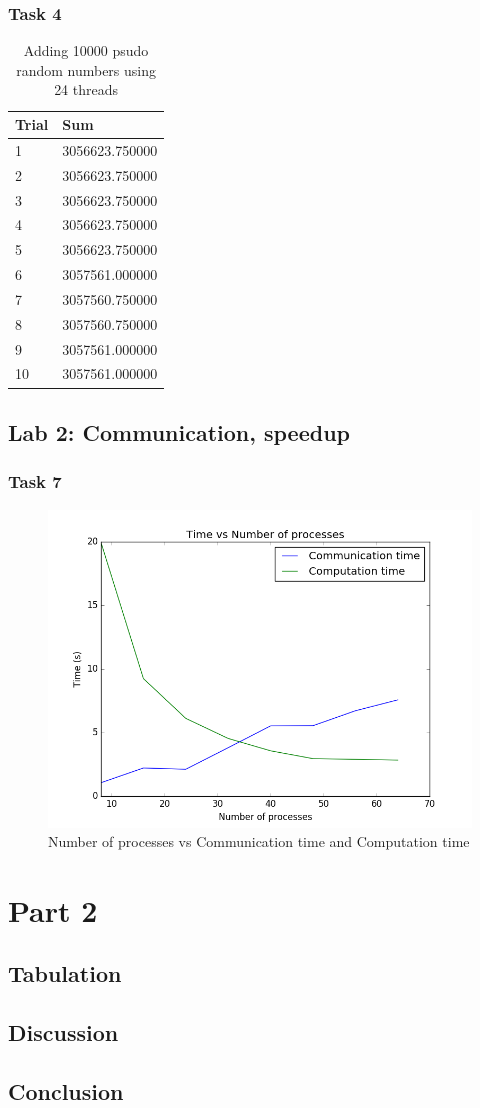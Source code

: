\documentclass[12pt]{article}
\begin{document}
  \subsubsection*{Task 4}
  \begin{table}[H]
    \centering
    \begin{tabular}{|l|l|}
      \hline
      Trial & Sum            \\ \hline
      1     & 3056623.750000 \\ \hline
      2     & 3056623.750000 \\ \hline
      3     & 3056623.750000 \\ \hline
      4     & 3056623.750000 \\ \hline
      5     & 3056623.750000 \\ \hline
      6     & 3057561.000000 \\ \hline
      7     & 3057560.750000 \\ \hline
      8     & 3057560.750000 \\ \hline
      9     & 3057561.000000 \\ \hline
      10    & 3057561.000000 \\ \hline
    \end{tabular}
    \caption{Adding 10000 psudo random numbers using 24 threads}
    \label{fig:lab2_task4}
  \end{table}

\subsection*{Lab 2: Communication, speedup}
  
  \subsubsection*{Task 7}
    \begin{figure}[ht]
      \centering
      \includegraphics[width=0.5\linewidth]{lab2_task7}
      \caption{Number of processes vs Communication time and Computation
      time}
      \label{fig:lab2_task7}
    \end{figure}


\section{Part 2}

\subsection{Tabulation}
\subsection{Discussion}
\subsection{Conclusion}
\end{document}

